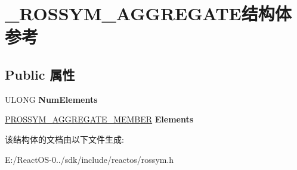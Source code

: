 \hypertarget{struct___r_o_s_s_y_m___a_g_g_r_e_g_a_t_e}{}\section{\+\_\+\+R\+O\+S\+S\+Y\+M\+\_\+\+A\+G\+G\+R\+E\+G\+A\+T\+E结构体 参考}
\label{struct___r_o_s_s_y_m___a_g_g_r_e_g_a_t_e}
\subsection*{Public 属性}
\begin{DoxyCompactItemize}
\item 
\mbox{\label{struct___r_o_s_s_y_m___a_g_g_r_e_g_a_t_e_a3140437a34c20e5914b0d346106e54c1}} 
U\+L\+O\+NG {\bfseries Num\+Elements}
\item 
\mbox{\label{struct___r_o_s_s_y_m___a_g_g_r_e_g_a_t_e_a6eae947f8be987eff6f9b4f0ae1e14ca}} 
\hyperlink{struct___r_o_s_s_y_m___a_g_g_r_e_g_a_t_e___m_e_m_b_e_r}{P\+R\+O\+S\+S\+Y\+M\+\_\+\+A\+G\+G\+R\+E\+G\+A\+T\+E\+\_\+\+M\+E\+M\+B\+ER} {\bfseries Elements}
\end{DoxyCompactItemize}


该结构体的文档由以下文件生成\+:\begin{DoxyCompactItemize}
\item 
E\+:/\+React\+O\+S-\/0../sdk/include/reactos/rossym.\+h\end{DoxyCompactItemize}
